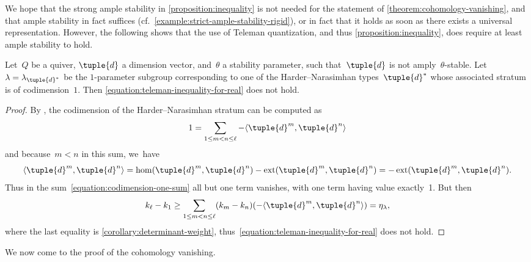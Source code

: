 We hope that the strong ample stability in \cref{proposition:inequality}
is not needed for the statement of \cref{theorem:cohomology-vanishing},
and that ample stability in fact suffices
(cf.~\cref{example:strict-ample-stability-rigid}),
or in fact that it holds as soon as there exists a universal representation.
However, the following shows that the use of Teleman quantization,
and thus \cref{proposition:inequality},
does require at least ample stability to hold.

\begin{lemma}
\label{lemma:teleman-implies-ample-stability}
Let~$Q$ be a quiver,
$\tuple{d}$ a dimension vector,
and~$\theta$ a stability parameter,
such that~$\tuple{d}$ is not amply~$\theta$-stable.
Let~$\lambda=\lambda_{\tuple{d}^*}$ be the $1$-parameter subgroup
corresponding to one of the Harder--Narasimhan types~$\tuple{d}^*$
whose associated stratum is of codimension~$1$.
Then \eqref{equation:teleman-inequality-for-real} does not hold.
\end{lemma}

\begin{proof}
By \cite[Prop.\,3.4]{MR1974891},
the codimension of the Harder--Narasimhan stratum can be computed as
\begin{equation}
\label{equation:codimension-one-sum}
1=\sum_{1\leq m<n\leq\ell}-\langle\tuple{d}^m,\tuple{d}^n\rangle
\end{equation}
and because~$m<n$ in this sum, we~have
\begin{equation*}
\langle\tuple{d}^m,\tuple{d}^n\rangle
=\operatorname{hom}(\tuple{d}^m,\tuple{d}^n)-\operatorname{ext}(\tuple{d}^m,\tuple{d}^n)
=-\operatorname{ext}(\tuple{d}^m,\tuple{d}^n).
\end{equation*}
Thus in the sum~\eqref{equation:codimension-one-sum}
all but one term vanishes,
with one term having value exactly~1.
But then
\begin{equation*}
k_\ell-k_1\geq\sum_{1\leq m<n\leq\ell}(k_m-k_n)(-\langle\tuple{d}^m,\tuple{d}^n\rangle)=\eta_\lambda,
\end{equation*}
where the last equality is \cref{corollary:determinant-weight},
thus~\eqref{equation:teleman-inequality-for-real} does not hold.
\end{proof}

We now come to the proof of the cohomology vanishing.

